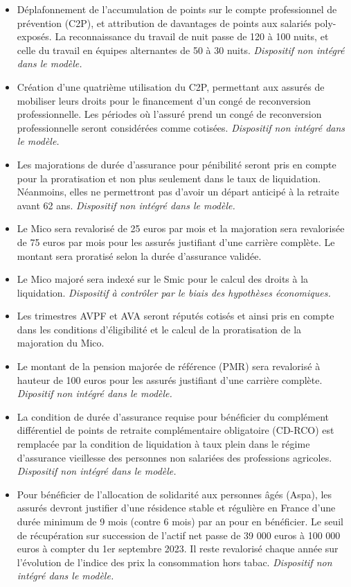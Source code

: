 \begin{itemize}
	\item Déplafonnement de l'accumulation de points sur le compte professionnel de prévention (C2P), et attribution de davantages de points aux salariés poly-exposés. La reconnaissance du travail de nuit passe de 120 à 100 nuits, et celle du travail en équipes alternantes de 50 à 30 nuits. \textit{Dispositif non intégré dans le modèle.}
	\item Création d'une quatrième utilisation du C2P, permettant aux assurés de mobiliser leurs droits pour le financement d'un congé de reconversion professionnelle. Les périodes où l'assuré prend un congé de reconversion professionnelle seront considérées comme cotisées. \textit{Dispositif non intégré dans le modèle.}
	\item Les majorations de durée d'assurance pour pénibilité seront pris en compte pour la proratisation et non plus seulement dans le taux de liquidation. Néanmoins, elles ne permettront pas d'avoir un départ anticipé à la retraite avant 62 ans. \textit{Dispositif non intégré dans le modèle.}
	\item Le Mico sera revalorisé de 25 euros par mois et la majoration sera revalorisée de 75 euros par mois pour les assurés justifiant d'une carrière complète. Le montant sera proratisé selon la durée d'assurance validée.
	\item Le Mico majoré sera indexé sur le Smic pour le calcul des droits à la liquidation. \textit{Dispositif à contrôler par le biais des hypothèses économiques.}
	\item Les trimestres AVPF et AVA seront réputés cotisés et ainsi pris en compte dans les conditions d'éligibilité et le calcul de la proratisation de la majoration du Mico.
	\item Le montant de la pension majorée de référence (PMR) sera revalorisé à hauteur de 100 euros pour les assurés justifiant d'une carrière complète. \textit{Dipositif non intégré dans le modèle.}
	\item La condition de durée d'assurance requise pour bénéficier du complément différentiel de points de retraite complémentaire obligatoire (CD-RCO) est remplacée par la condition de liquidation à taux plein dans le régime d'assurance vieillesse des personnes non salariées des professions agricoles. \textit{Dispositif non intégré dans le modèle.}
	\item Pour bénéficier de l'allocation de solidarité aux personnes âgés (Aspa), les assurés devront justifier d'une résidence stable et régulière en France d'une durée minimum de 9 mois (contre 6 mois) par an pour en bénéficier. Le seuil de récupération sur succession de l'actif net passe de 39 000 euros à 100 000 euros à compter du 1er septembre 2023. Il reste revalorisé chaque année sur l'évolution de l'indice des prix la consommation hors tabac. \textit{Dispositif non intégré dans le modèle.}

\end{itemize}
